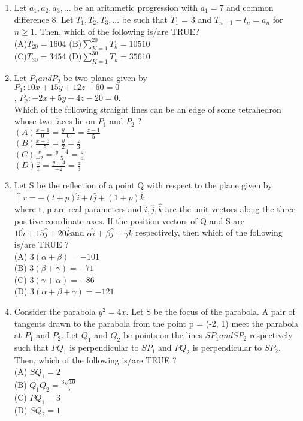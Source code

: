 \documentclass{article}
\begin{document}
\begin{enumerate}
 
	\item Let $a_1, a_2, a_3,...$ be an arithmetic progression with $a_1 = 7$ and common difference 8. Let 
$T_1, T_2, T_3,$... be such that $T_1$ = 3 and $T_{n+1} - t_n = a_n$ for $n\ge1$. Then, which of the following is/are TRUE?\\
	(A)$T_{20} =1604$ \qquad  (B)$\sum_{K=1}^{20}T_k=10510$\\
		(C)$T_{30}=3454$ \qquad   (D)$\sum_{K=1}^{30}T_k=35610$   \\
\medskip


	\item Let $P_1 and P_2$ be two planes given by \\
\qquad $P_1: 10x + 15y + 12z - 60 = 0$\\ ,
\qquad $P_2 : -2x + 5y + 4z - 20 = 0$.\\
Which of the following straight lines can be an edge of some tetrahedron whose two faces lie on $P_1$
and $P_2$ ?\\
 $(A) \frac{x-1}{0} =\frac{y-1}{0} =\frac{z-1}{5}$\\ 
 $(B)\frac{x-6}{-5} =\frac{y}{2} =\frac{z}{3}$\\
 $(C)\frac{x}{-2} =\frac{y-4}{5} =\frac{z}{4}$\\
 $(D)\frac{x}{1} =\frac{y-4}{-2} =\frac{z}{3}$\\
\medskip


  \item  Let S be the reflection of a point Q with respect to the plane given by\\
\qquad\qquad $\uparrow{r}=-(t+p)\hat{i}+t\hat{j}+(1+p)\hat{k}$\\
 where t, p are real parameters and $\hat{i}, \hat{j} ,\hat{k}$ are the unit vectors along the three positive coordinate 
axes. If the position vectors of Q and S are $10\hat{i}+ 15\hat{j}+ 20\hat{k} $and $\alpha\hat{i}+ \beta\hat{j}+ \gamma\hat{k}$ respectively, then which of the following is/are TRUE ?\\
(A) $3(\alpha+\beta)=-101$\\
(B) $3(\beta+\gamma)=-71$\\
(C) $3(\gamma+\alpha)=-86$\\
(D) $3(\alpha+\beta+\gamma)=-121$\\
\medskip


	\item Consider the parabola $y^2 = 4x$. Let S be the focus of the parabola. A pair of tangents drawn to the 
parabola from the point p = (-2, 1) meet the parabola at $P_1$ and $P_2$. Let $Q_1$ and $Q_2$ be points on the 
lines $SP_1 and SP_2$ respectively such that $PQ_1$ is perpendicular to $SP_1$ and $PQ_2$ is perpendicular to 
$SP_2$. Then, which of the following is/are TRUE ?\\
(A) $SQ_1=2$\\
(B) $Q_1Q_2=\frac{3\sqrt{10}}{5}$\\
(C) $PQ_1=3$\\
(D) $SQ_2=1$\\
\medskip



\end{enumerate}
\end{document}
